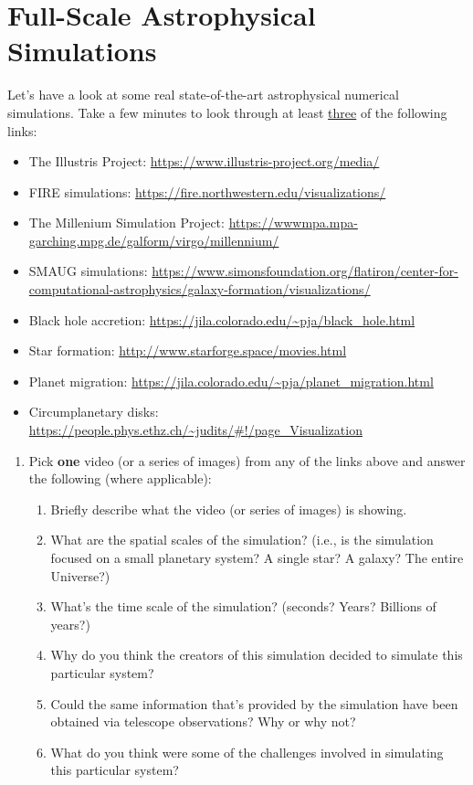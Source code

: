 \documentclass[11pt]{article}
\begin{document}
\section{Full-Scale Astrophysical Simulations} \label{sec:sims}

\medskip \noindent
Let's have a look at some real state-of-the-art astrophysical numerical simulations. Take a few minutes to look through at least \underline{three} of the following links:
\begin{itemize}
    \item The Illustris Project: \url{https://www.illustris-project.org/media/}
    \item FIRE simulations: \url{https://fire.northwestern.edu/visualizations/}
    \item The Millenium Simulation Project: \url{https://wwwmpa.mpa-garching.mpg.de/galform/virgo/millennium/}
    \item SMAUG simulations: \url{https://www.simonsfoundation.org/flatiron/center-for-computational-astrophysics/galaxy-formation/visualizations/}
    \item Black hole accretion: \url{https://jila.colorado.edu/~pja/black_hole.html}
    \item Star formation: \url{http://www.starforge.space/movies.html}
    \item Planet migration: \url{https://jila.colorado.edu/~pja/planet_migration.html}
    \item Circumplanetary disks: \url{https://people.phys.ethz.ch/~judits/#!/page_Visualization}
\end{itemize}

\bigskip

\begin{enumerate}[resume]
    \item Pick \textbf{one} video (or a series of images) from any of the links above and answer the following (where applicable): 
    \begin{enumerate}
        \item Briefly describe what the video (or series of images) is showing.
        
        \item What are the spatial scales of the simulation? (i.e., is the simulation focused on a small planetary system? A single star? A galaxy? The entire Universe?)
        
        \item What's the time scale of the simulation? (seconds? Years? Billions of years?)
        
        \item Why do you think the creators of this simulation decided to simulate this particular system?
        
        \item Could the same information that's provided by the simulation have been obtained via telescope observations? Why or why not?
        
        \item What do you think were some of the challenges involved in simulating this particular system?
    \end{enumerate}    
\end{enumerate}
\end{document}
